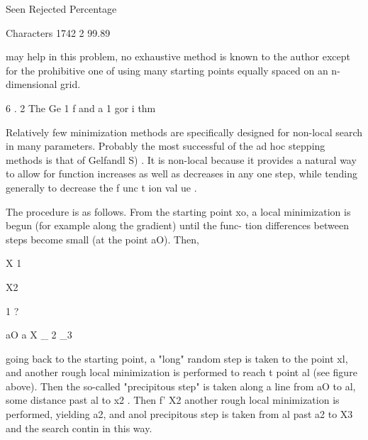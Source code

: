                  Seen Rejected  Percentage
 
Characters       1742        2   99.89
 
 
 
may help in this problem, no exhaustive method is known to the author
except for the prohibitive one of using many starting points equally
spaced on an n-dimensional grid.
 
 
6 . 2 The Ge 1 f and a 1 gor i thm
 
      Relatively few minimization methods are specifically designed for
non-local search in many parameters. Probably the most successful of
the ad hoc stepping methods is that of Gelfandl S) . It is non-local
because it provides a natural way to allow for function increases as
well as decreases in any one step, while tending generally to decrease
the f unc t ion val ue .
 
      The procedure is as follows. From the starting point xo, a local
minimization is begun (for example along the gradient) until the func-
tion differences between steps become small (at the point aO). Then,
 
                        X 1
 
 
 
 
 
 
 
 
 
 
 
 
 
 
 
 
 
 
 
 
 
 
 
 
 
 
 
 
 
 
 
 
 
 
                              X2
 
 
                           1      ?
 
                  aO              a   X
                                 _ 2     _3
 
 
 
going back to the starting point, a "long" random step is taken to the
point xl, and another rough local minimization is performed to reach t
point al (see figure above). Then the so-called "precipitous step" is
taken along a line from aO to al, some distance past al to x2 . Then f'
X2 another rough local minimization is performed, yielding a2, and anol
precipitous step is taken from al past a2 to X3  and the search contin
in this way.
 
